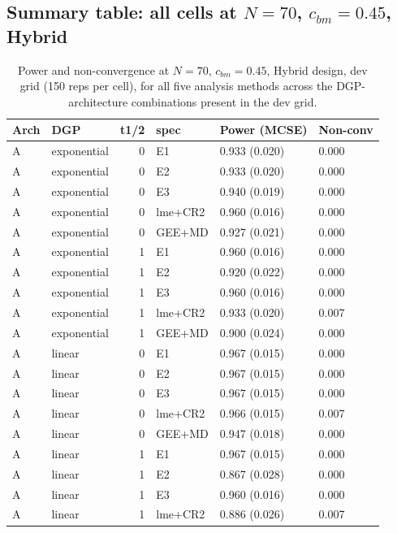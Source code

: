 \documentclass[
  11pt,
]{article}
\begin{document}
\subsection{\texorpdfstring{Summary table: all cells at \(N = 70\), \(c_{bm} = 0.45\), Hybrid}{Summary table: all cells at N = 70, c\_\{bm\} = 0.45, Hybrid}}\label{summary-table-all-cells-at-n-70-c_bm-0.45-hybrid}

\begin{longtable}[t]{llrlll}
\caption{\label{tab:all-cells-table}Power and non-convergence at $N = 70$, $c_{bm} = 0.45$,
    Hybrid design, dev grid (150 reps per cell), for all five
    analysis methods across the DGP-architecture combinations
    present in the dev grid.}\\
\toprule
Arch & DGP & t1/2 & spec & Power (MCSE) & Non-conv\\
\midrule
A & exponential & 0 & E1 & 0.933 (0.020) & 0.000\\
A & exponential & 0 & E2 & 0.933 (0.020) & 0.000\\
A & exponential & 0 & E3 & 0.940 (0.019) & 0.000\\
A & exponential & 0 & lme+CR2 & 0.960 (0.016) & 0.000\\
A & exponential & 0 & GEE+MD & 0.927 (0.021) & 0.000\\
\addlinespace
A & exponential & 1 & E1 & 0.960 (0.016) & 0.000\\
A & exponential & 1 & E2 & 0.920 (0.022) & 0.000\\
A & exponential & 1 & E3 & 0.960 (0.016) & 0.000\\
A & exponential & 1 & lme+CR2 & 0.933 (0.020) & 0.007\\
A & exponential & 1 & GEE+MD & 0.900 (0.024) & 0.000\\
\addlinespace
A & linear & 0 & E1 & 0.967 (0.015) & 0.000\\
A & linear & 0 & E2 & 0.967 (0.015) & 0.000\\
A & linear & 0 & E3 & 0.967 (0.015) & 0.000\\
A & linear & 0 & lme+CR2 & 0.966 (0.015) & 0.007\\
A & linear & 0 & GEE+MD & 0.947 (0.018) & 0.000\\
\addlinespace
A & linear & 1 & E1 & 0.967 (0.015) & 0.000\\
A & linear & 1 & E2 & 0.867 (0.028) & 0.000\\
A & linear & 1 & E3 & 0.960 (0.016) & 0.000\\
A & linear & 1 & lme+CR2 & 0.886 (0.026) & 0.007\\

\end{longtable}
\end{document}
